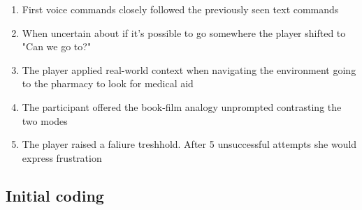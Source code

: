 \begin{enumerate}
    \item First voice commands closely followed the previously seen text commands
    \item When uncertain about if it's possible to go somewhere the player shifted to "Can we go to?"
    \item The player applied real-world context when navigating the environment going to the pharmacy to look for medical aid
    \item The participant offered the book-film analogy unprompted contrasting the two modes 
    \item The player raised a faliure treshhold. After 5 unsuccessful attempts she would express frustration
    
\end{enumerate}

\subsection{Initial coding}

